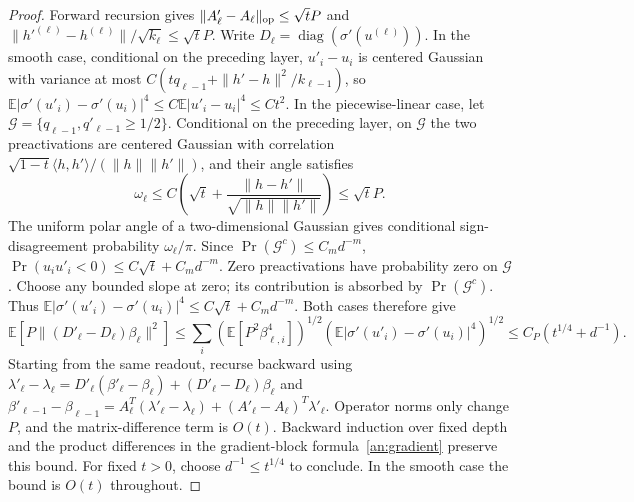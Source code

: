 \documentclass[a4paper]{tufte-handout}
\newcommand{\E}{\mathbb E}
\begin{document}
\begin{fullwidth}
\begin{proof}
Forward recursion gives
$\|A'_\ell-A_\ell\|_{\rm op}\le\sqrt tP$ and
$\|h'^{(\ell)}-h^{(\ell)}\|/\sqrt{k_\ell}\le\sqrt tP$.
Write $D_\ell=\operatorname{diag}(\sigma'(u^{(\ell)}))$.
In the smooth case, conditional on the preceding layer, $u'_i-u_i$ is centered Gaussian with variance at most
$C(tq_{\ell-1}+\|h'-h\|^2/k_{\ell-1})$, so
$\E|\sigma'(u'_i)-\sigma'(u_i)|^4\le C\E|u'_i-u_i|^4\le Ct^2$.
In the piecewise-linear case, let $\mathcal G=\{q_{\ell-1},q'_{\ell-1}\ge1/2\}$.
Conditional on the preceding layer, on $\mathcal G$ the two preactivations are centered Gaussian with correlation
$\sqrt{1-t}\langle h,h'\rangle/(\|h\|\|h'\|)$, and their angle satisfies
\[
 \omega_\ell\le C\left(\sqrt t+
 \frac{\|h-h'\|}{\sqrt{\|h\|\|h'\|}}\right)\le\sqrt tP.
\]
The uniform polar angle of a two-dimensional Gaussian gives conditional sign-disagreement probability $\omega_\ell/\pi$.
Since $\Pr(\mathcal G^c)\le C_md^{-m}$,
$\Pr(u_iu'_i<0)\le C\sqrt t+C_md^{-m}$.
Zero preactivations have probability zero on $\mathcal G$. Choose any bounded slope at zero; its contribution is absorbed by $\Pr(\mathcal G^c)$. Thus
$\E|\sigma'(u'_i)-\sigma'(u_i)|^4\le C\sqrt t+C_md^{-m}$.
Both cases therefore give
\[
 \E[P\|(D'_\ell-D_\ell)\beta_\ell\|^2]
 \le\sum_i(\E[P^2\beta_{\ell,i}^4])^{1/2}
       (\E|\sigma'(u'_i)-\sigma'(u_i)|^4)^{1/2}
 \le C_P(t^{1/4}+d^{-1}).
\]
Starting from the same readout, recurse backward using
$\lambda'_\ell-\lambda_\ell
 =D'_\ell(\beta'_\ell-\beta_\ell)+(D'_\ell-D_\ell)\beta_\ell$ and
$\beta'_{\ell-1}-\beta_{\ell-1}
 =A_\ell^T(\lambda'_\ell-\lambda_\ell)+(A'_\ell-A_\ell)^T\lambda'_\ell$.
Operator norms only change $P$, and the matrix-difference term is $O(t)$. Backward induction over fixed depth and the product differences in the gradient-block formula~\eqref{an:gradient} preserve this bound.
For fixed $t>0$, choose $d^{-1}\le t^{1/4}$ to conclude. In the smooth case the bound is $O(t)$ throughout.
\end{proof}


\end{fullwidth}
\end{document}

